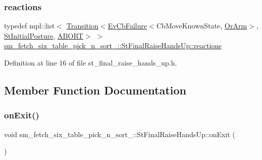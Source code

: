 \subsubsection{\texorpdfstring{reactions}{reactions}}
{\footnotesize\ttfamily typedef mpl\+::list$<$ \hyperlink{classsmacc_1_1Transition}{Transition}$<$\hyperlink{structsmacc_1_1EvCbFailure}{Ev\+Cb\+Failure}$<$Cb\+Move\+Known\+State, \hyperlink{classsm__fetch__six__table__pick__n__sort__1_1_1OrArm}{Or\+Arm}$>$, \hyperlink{structsm__fetch__six__table__pick__n__sort__1_1_1StInitialPosture}{St\+Initial\+Posture}, \hyperlink{structsmacc_1_1default__transition__tags_1_1ABORT}{A\+B\+O\+RT}$>$ $>$ \hyperlink{structsm__fetch__six__table__pick__n__sort__1_1_1StFinalRaiseHandsUp_aea5e796b5e6ef62ea41fa7333798b1b8}{sm\+\_\+fetch\+\_\+six\+\_\+table\+\_\+pick\+\_\+n\+\_\+sort\+\_\+::\+St\+Final\+Raise\+Hands\+Up\+::reactions}}



Definition at line 16 of file st\+\_\+final\+\_\+raise\+\_\+hands\+\_\+up.\+h.



\subsection{Member Function Documentation}
\mbox{\label{structsm__fetch__six__table__pick__n__sort__1_1_1StFinalRaiseHandsUp_a836de76599b6c65590873b5b50b1507f}} 
\subsubsection{\texorpdfstring{on\+Exit()}{onExit()}}
{\footnotesize\ttfamily void sm\+\_\+fetch\+\_\+six\+\_\+table\+\_\+pick\+\_\+n\+\_\+sort\+\_\+::\+St\+Final\+Raise\+Hands\+Up\+::on\+Exit (\begin{DoxyParamCaption}\item[{\hyperlink{structsmacc_1_1default__transition__tags_1_1ABORT}{A\+B\+O\+RT}}]{ }\end{DoxyParamCaption})\hspace{0.3cm}{\ttfamily [inline]}}



